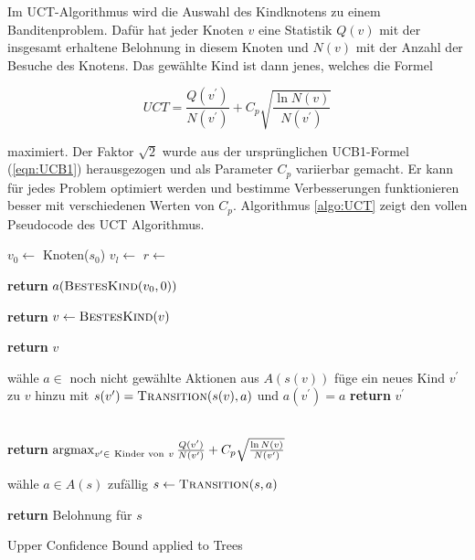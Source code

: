 \bigskip
Im UCT-Algorithmus wird die Auswahl des Kindknotens zu einem Banditenproblem. Dafür hat jeder Knoten $v$ eine Statistik $Q(v)$ mit der insgesamt erhaltene Belohnung in diesem Knoten und $N(v)$ mit der Anzahl der Besuche des Knotens. Das gewählte Kind ist dann jenes, welches die Formel

\begin{equation}
UCT = \frac{Q(v^\prime)}{N(v^ \prime)} + C_p\sqrt{\frac{\ln N(v)}{N(v^\prime)}}
\label{eqn:UCT}
\end{equation}

maximiert. Der Faktor $\sqrt{2}$ wurde aus der ursprünglichen UCB1-Formel (\ref{eqn:UCB1}) herausgezogen und als Parameter $C_p$ variierbar gemacht. Er kann für jedes Problem optimiert werden und bestimme Verbesserungen funktionieren besser mit verschiedenen Werten von $C_p$. Algorithmus \ref{algo:UCT} zeigt den vollen Pseudocode des UCT Algorithmus.

\begin{algorithm}[H]
\begin{algorithmic}[1]
	\State $v_0\gets$ Knoten($s_0$)
		\State $v_l\gets$ 
		\State $r\gets$ 
		\State {}
	\EndWhile 
	
\State \textbf{return} $a(\Call{BestesKind}{v_0,0})$
\EndFunction

			\State \textbf{return} 
		\Else
			\State $v \gets \textsc{BestesKind}(v)$
		\EndIf
	\EndWhile
	 
	\State \textbf{return} $v$
\EndFunction

	\State wähle $a \in$ noch nicht gewählte Aktionen aus $A(s(v))$
	\State füge ein neues Kind $v^\prime$ zu $v$ hinzu
	\State mit $s(v^\prime) = \textsc{Transition}(s(v),a)$
		\State und $a(v^\prime) = a$
		\State \textbf{return} $v^\prime$
\EndFunction

\\
\State \textbf{return} $\operatorname*{argmax}_{v^\prime \in\ \text{Kinder von}\ v} \frac{Q(v^\prime)}{N(v^\prime)} + C_p \sqrt{\frac{\ln N(v)}{N(v^\prime)}}$
\EndFunction

\State wähle $a \in A(s)$ zufällig
\State $s \gets \textsc{Transition}(s,a)$
\EndWhile

\State \textbf{return} Belohnung für $s$
\EndFunction
\end{algorithmic}
\caption{Upper Confidence Bound applied to Trees\footnotemark}
\label{algo:UCT}
\end{algorithm}

